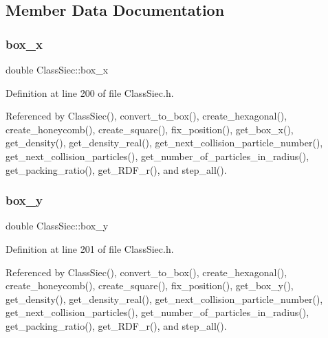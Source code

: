 \subsection{Member Data Documentation}
\mbox{\label{classClassSiec_a8ebc9e2a0a8f7ccf4736482aa2a5f673}} 
\subsubsection{\texorpdfstring{box\+\_\+x}{box\_x}}
{\footnotesize\ttfamily double Class\+Siec\+::box\+\_\+x}



Definition at line 200 of file Class\+Siec.\+h.



Referenced by Class\+Siec(), convert\+\_\+to\+\_\+box(), create\+\_\+hexagonal(), create\+\_\+honeycomb(), create\+\_\+square(), fix\+\_\+position(), get\+\_\+box\+\_\+x(), get\+\_\+density(), get\+\_\+density\+\_\+real(), get\+\_\+next\+\_\+collision\+\_\+particle\+\_\+number(), get\+\_\+next\+\_\+collision\+\_\+particles(), get\+\_\+number\+\_\+of\+\_\+particles\+\_\+in\+\_\+radius(), get\+\_\+packing\+\_\+ratio(), get\+\_\+\+R\+D\+F\+\_\+r(), and step\+\_\+all().

\mbox{\label{classClassSiec_a51b98a4d58f22b84e410eaf2c7b31c4b}} 
\subsubsection{\texorpdfstring{box\+\_\+y}{box\_y}}
{\footnotesize\ttfamily double Class\+Siec\+::box\+\_\+y}



Definition at line 201 of file Class\+Siec.\+h.



Referenced by Class\+Siec(), convert\+\_\+to\+\_\+box(), create\+\_\+hexagonal(), create\+\_\+honeycomb(), create\+\_\+square(), fix\+\_\+position(), get\+\_\+box\+\_\+y(), get\+\_\+density(), get\+\_\+density\+\_\+real(), get\+\_\+next\+\_\+collision\+\_\+particle\+\_\+number(), get\+\_\+next\+\_\+collision\+\_\+particles(), get\+\_\+number\+\_\+of\+\_\+particles\+\_\+in\+\_\+radius(), get\+\_\+packing\+\_\+ratio(), get\+\_\+\+R\+D\+F\+\_\+r(), and step\+\_\+all().

